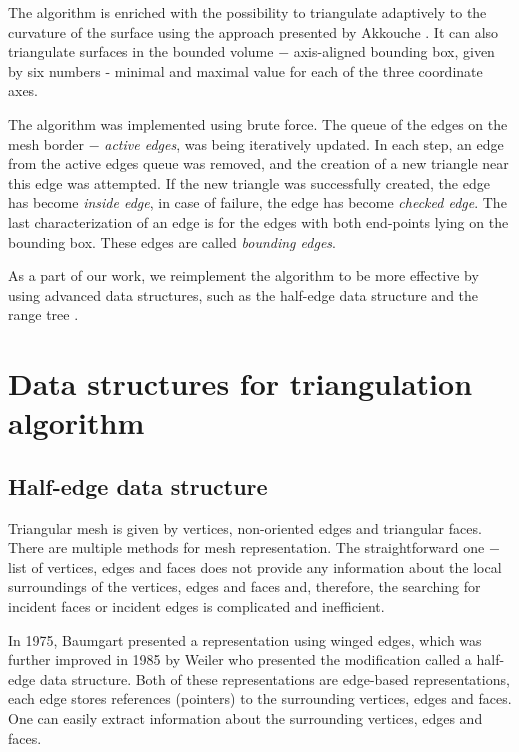 The algorithm is enriched with the possibility to triangulate adaptively
to the curvature of the surface using the approach presented by Akkouche 
\cite{akkouche2001adaptive}. It can also triangulate surfaces in the
bounded volume $-$ axis-aligned bounding box, given by six numbers - minimal
and maximal value for each of the three coordinate axes.

The algorithm was implemented using brute force. The queue of the edges
on the mesh border $-$ \textit{active edges}, was being iteratively updated. 
In each step, an edge from the active edges queue was removed, and the creation of a new triangle near this edge was attempted.
If the new triangle was successfully created, the edge has become 
\textit{inside edge}, in case of failure, the edge has become 
\textit{checked edge}. The last characterization of an edge is for
the edges with both end-points lying on the bounding box. These edges
are called \textit{bounding edges}.

As a part of our work, we reimplement the algorithm to be more effective by
using advanced data structures, such as the half-edge data structure 
\cite{kettner1999using} and the range tree \cite{lueker1978data}.

\section{Data structures for triangulation algorithm}
\label{sub2.5}

\subsection{Half-edge data structure}
Triangular mesh is given by vertices, non-oriented edges and triangular faces.
There are multiple methods for mesh representation. The straightforward one $-$
list of vertices, edges and faces does not provide any information about
the local surroundings of the vertices, edges and faces and, therefore, the searching
for incident faces or incident edges is complicated and inefficient.

In 1975, Baumgart \cite{baumgart1975polyhedron} presented a representation
using winged edges, which was further improved in 1985 by Weiler \cite{weiler1985edge}
who presented the modification called a \newline half-edge data structure.
Both of these representations are edge-based representations, each edge stores
references (pointers) to the surrounding vertices, edges and faces. One can easily extract information about the
surrounding vertices, edges and faces.


